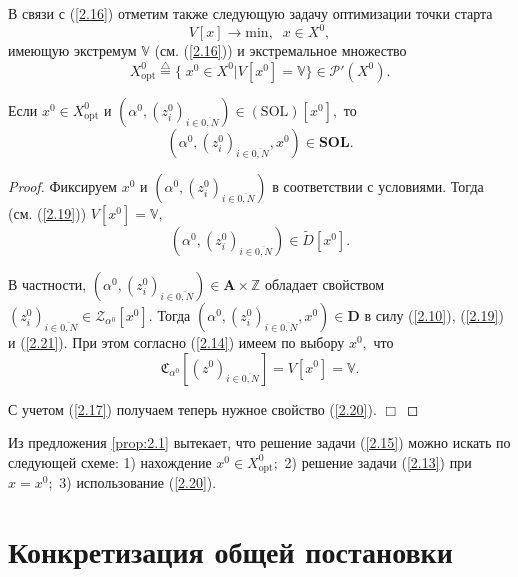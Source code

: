 \documentclass[10pt]{SPIIRAS_Proceedings}
\begin{document}
В связи с (\ref{2.16})
отметим также следующую задачу оптимизации точки старта
\begin{equation}\label{2.18}
  V[x] \longrightarrow \mathrm{min},\;\;x \in X^0,
\end{equation}
имеющую экстремум $\mathbb{V}$
(см. (\ref{2.16})) и экстремальное множество
\begin{equation}\label{2.19}
  X^0_{\mathrm{opt}} \stackrel{\triangle}{=} \{\;x^0 \in X^0 \vert V[x^0] = \mathbb{V}\} \in \mathcal{P}'(X^0).
\end{equation}

\begin{proposition}
\label{prop:2.1}
Если
$x^0 \in X^0_{\mathrm{opt}}$ и $(\alpha^0,(z_i^0)_{i \in \overline{0,N}}) \in (\mathrm{SOL})[x^0],$
то
\begin{equation}\label{2.20}
  (\alpha^0,(z_i^0)_{i \in \overline{0,N}},x^0) \in \mathbf{SOL}.
\end{equation}
\end{proposition}

\begin{proof}

Фиксируем $x^0$ и $(\alpha^0,(z_i^0)_{i \in \overline{0,N}})$
в соответствии с условиями.
Тогда (см. (\ref{2.19}))
$V[x^0] = \mathbb{V},$
\begin{equation}\label{2.21}
 (\alpha^0,(z_i^0)_{i \in \overline{0,N}}) \in \tilde{D}[x^0].
\end{equation}

В частности,
$(\alpha^0,(z_i^0)_{i \in \overline{0,N}}) \in \mathbf{A} \times \mathbb{Z}$
обладает свойством
$(z_i^0)_{i \in \overline{0,N}} \in \mathcal{Z}_{\alpha^0}[x^0].$
Тогда
$(\alpha^0,(z_i^0)_{i \in \overline{0,N}},x^0) \in \mathbf{D}$
в силу (\ref{2.10}), (\ref{2.19}) и (\ref{2.21}).
При этом согласно (\ref{2.14})
имеем по выбору $x^0,$ что
$$
  \mathfrak{C}_{\alpha^0}[(z^0)_{i \in \overline{0,N}}] = V[x^0] = \mathbb{V}.
$$

С учетом (\ref{2.17}) получаем теперь нужное свойство (\ref{2.20}).
\hfill $\Box$
\end{proof}

Из предложения \ref{prop:2.1} вытекает,
что решение задачи (\ref{2.15})
можно искать по следующей схеме:
1) нахождение $x^0 \in X^0_{\mathrm{opt}};$
2) решение задачи (\ref{2.13}) при $x = x^0;$
3) использование (\ref{2.20}).

\section{Конкретизация общей постановки}
\end{document}
